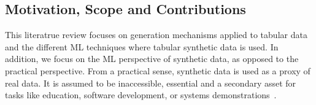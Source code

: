 \documentclass[parskip=full]{scrartcl}
\begin{document}

\subsection{Motivation, Scope and Contributions}


This literatrue review focuses on generation mechanisms applied to tabular
data and the different ML techniques where tabular synthetic data is used. In
addition, we focus on the ML perspective of synthetic data, as opposed to the
practical perspective. From a practical sense, synthetic data is used as a
proxy of real data. It is assumed to be inaccessible, essential and a
secondary asset for tasks like education, software development, or systems
demonstrations~\cite{mannino2019real}. 
\end{document}
